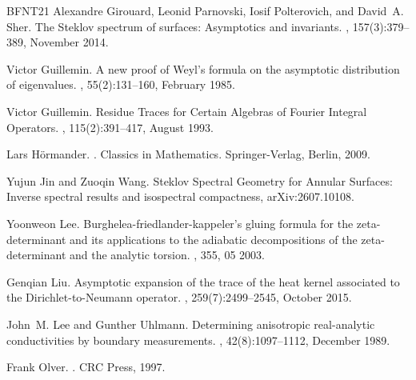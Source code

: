 \documentclass[11pt]{amsart}
\theoremstyle{definition}
\numberwithin{equation}{section}
\begin{document}
\begin{thebibliography}{BFNT21}
    Alexandre Girouard, Leonid Parnovski, Iosif Polterovich, and David~A. Sher.
    \newblock The {{Steklov}} spectrum of surfaces: Asymptotics and invariants.
    , 157(3):379--389, November 2014.
    
    Victor Guillemin.
    \newblock A new proof of {{Weyl}}'s formula on the asymptotic distribution of
      eigenvalues.
    , 55(2):131--160, February 1985.
    
    Victor Guillemin.
    \newblock Residue {{Traces}} for {{Certain Algebras}} of {{Fourier Integral
      Operators}}.
    , 115(2):391--417, August 1993.
    
    Lars H{\"o}rmander.
    .
    \newblock Classics in {{Mathematics}}. Springer-Verlag, Berlin, 2009.
    
    Yujun Jin and Zuoqin Wang.
    \newblock Steklov {{Spectral Geometry}} for {{Annular Surfaces}}: {{Inverse}}
      spectral results and isospectral compactness, arXiv:2607.10108.
    
    Yoonweon Lee.
    \newblock Burghelea-friedlander-kappeler's gluing formula for the
      zeta-determinant and its applications to the adiabatic decompositions of the
      zeta-determinant and the analytic torsion.
    , 355, 05
      2003.
    
    Genqian Liu.
    \newblock Asymptotic expansion of the trace of the heat kernel associated to
      the {{Dirichlet-to-Neumann}} operator.
    , 259(7):2499--2545, October
      2015.
    
    John~M. Lee and Gunther Uhlmann.
    \newblock Determining anisotropic real-analytic conductivities by boundary
      measurements.
    , 42(8):1097--1112, December 1989.
    
    Frank Olver.
    .
    \newblock CRC Press, 1997.
    

\end{thebibliography}
\end{document}
